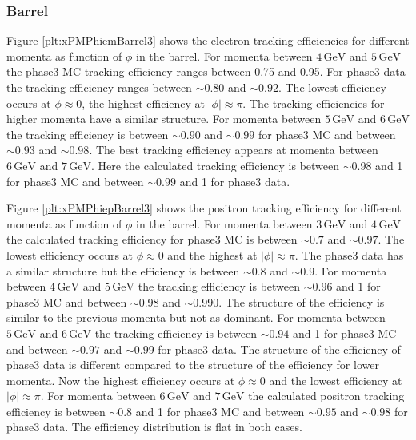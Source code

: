 \documentclass[a4paper,11pt,twosided,final,german,openbib,pdftex,listof=totoc,bibliography=totoc]{scrbook}
\begin{document}
\newpage
\subsubsection{Barrel}

Figure \ref{plt:xPMPhiemBarrel3} shows the electron tracking efficiencies for different momenta as function of $\phi$ in the barrel.
For momenta between $4\,\textrm{GeV}$ and $5\,\textrm{GeV}$ the phase3 MC tracking efficiency ranges between 0.75 and 0.95. For phase3 data the tracking efficiency ranges between $ \sim 0.80$ and $\sim 0.92$. The lowest efficiency occurs at $\phi \approx 0$, the highest efficiency at $|\phi| \approx \pi$.
The tracking efficiencies for higher momenta have a similar structure. 
For momenta between $5\,\textrm{GeV}$ and $6\,\textrm{GeV}$ the tracking efficiency is between $\sim 0.90$ and $\sim 0.99$ for phase3 MC and between $\sim 0.93$ and $\sim 0.98$. The best tracking efficiency appears at momenta between $6\,\textrm{GeV}$ and $7\,\textrm{GeV}$. Here the calculated tracking efficiency is between $\sim 0.98$ and 1 for phase3 MC and between $\sim 0.99$ and 1 for phase3 data.

Figure \ref{plt:xPMPhiepBarrel3} shows the positron tracking efficiency for different momenta as function of $\phi$ in the barrel. 
For momenta between $3\,\textrm{GeV}$ and $4\,\textrm{GeV}$ the calculated tracking efficiency for phase3 MC is between $\sim 0.7$ and $\sim 0.97$. The lowest efficiency  occurs at $\phi \approx 0$ and the highest at $|\phi| \approx \pi$. The phase3 data has a similar structure but the efficiency is between $\sim 0.8$ and $\sim 0.9$.
For momenta between $4\,\textrm{GeV}$ and $5\,\textrm{GeV}$ the tracking efficiency is between $\sim 0.96$ and $1$ for phase3 MC and between $\sim 0.98$ and $\sim 0.990$. The structure of the efficiency is similar to the previous momenta but not as dominant.
For momenta between $5\,\textrm{GeV}$ and $6\,\textrm{GeV}$ the tracking efficiency is between $\sim 0.94$ and 1 for phase3 MC and between $\sim 0.97$ and $\sim 0.99$ for phase3 data. The structure of the efficiency of phase3 data is different compared to the structure of the efficiency for lower momenta. Now the highest efficiency occurs at $\phi \approx 0$ and the lowest efficiency at $|\phi| \approx \pi$.
For momenta between $6\,\textrm{GeV}$ and $7\,\textrm{GeV}$ the calculated positron tracking efficiency is  between $\sim 0.8$ and 1 for phase3 MC and between $\sim 0.95$ and $\sim 0.98$ for phase3 data. The efficiency distribution is flat in both cases.
\end{document}
